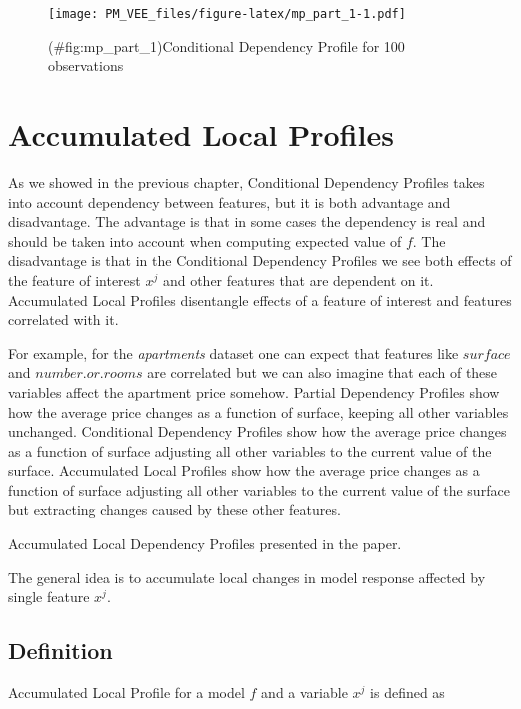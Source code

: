 \documentclass[12pt,]{krantz}
\theoremstyle{definition}
\theoremstyle{definition}
\theoremstyle{definition}
\theoremstyle{remark}
\begin{document}
\begin{figure}
\centering
\texttt{[image: PM\_VEE\_files/figure-latex/mp\_part\_1-1.pdf]}
\caption{(\#fig:mp\_part\_1)Conditional Dependency Profile for 100
observations}
\end{figure}

\hypertarget{accumulatedLocalProfiles}{%
\section{Accumulated Local Profiles}\label{accumulatedLocalProfiles}}

As we showed in the previous chapter, Conditional Dependency Profiles
takes into account dependency between features, but it is both advantage
and disadvantage. The advantage is that in some cases the dependency is
real and should be taken into account when computing expected value of
\(f\). The disadvantage is that in the Conditional Dependency Profiles
we see both effects of the feature of interest \(x^j\) and other
features that are dependent on it. Accumulated Local Profiles
disentangle effects of a feature of interest and features correlated
with it.

For example, for the \emph{apartments} dataset one can expect that
features like \(surface\) and \(number.or.rooms\) are correlated but we
can also imagine that each of these variables affect the apartment price
somehow. Partial Dependency Profiles show how the average price changes
as a function of surface, keeping all other variables unchanged.
Conditional Dependency Profiles show how the average price changes as a
function of surface adjusting all other variables to the current value
of the surface. Accumulated Local Profiles show how the average price
changes as a function of surface adjusting all other variables to the
current value of the surface but extracting changes caused by these
other features.

Accumulated Local Dependency Profiles presented in the \citep{R-ALEPlot}
paper.

The general idea is to accumulate local changes in model response
affected by single feature \(x^j\).

\hypertarget{definition-2}{%
\subsection{Definition}\label{definition-2}}

Accumulated Local Profile for a model \(f\) and a variable \(x^j\) is
defined as
\end{document}
